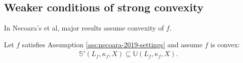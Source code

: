 \documentclass[12pt]{report}
\begin{document}
        \subsection{Weaker conditions of strong convexity}
            In Necoara's et al, major results assume convexity of $f$. 
            \begin{theorem}\label{thm:qscnvx-means-qua}
                Let $f$ satisfies Assumption \ref{ass:necoara-2019-settings} and assume $f$ is convex: 
                \begin{align*}
                    \mathbb S'(L_f, \kappa_f, X) \subseteq \mathbb U(L_f, \kappa_f, X). 
                \end{align*}
            \end{theorem}
\end{document}
